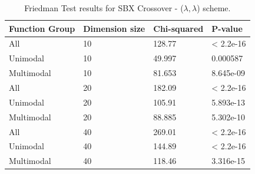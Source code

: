 \begin{table}[h]
	\centering
	\begin{tabular}{|l|l|l|l|}
		\hline
		\textbf{Function Group} & \textbf{Dimension size}      & \textbf{Chi-squared}        & \textbf{P-value}                     \\ \hline
		\multicolumn{1}{|l|}{All} & \multicolumn{1}{|l|}{10} & \multicolumn{1}{l|}{128.77} & \multicolumn{1}{l|}{< 2.2e-16} \\ \hline
		\multicolumn{1}{|l|}{Unimodal} & \multicolumn{1}{|l|}{10} & \multicolumn{1}{l|}{49.997} & \multicolumn{1}{l|}{0.000587} \\ \hline
		\multicolumn{1}{|l|}{Multimodal} & \multicolumn{1}{|l|}{10} & \multicolumn{1}{l|}{81.653} & \multicolumn{1}{l|}{8.645e-09}  \\ \hline
		\hline
		\multicolumn{1}{|l|}{All} & \multicolumn{1}{|l|}{20} & \multicolumn{1}{l|}{182.09} & \multicolumn{1}{l|}{< 2.2e-16} \\ \hline
		\multicolumn{1}{|l|}{Unimodal} & \multicolumn{1}{|l|}{20} & \multicolumn{1}{l|}{105.91} & \multicolumn{1}{l|}{5.893e-13} \\ \hline
		\multicolumn{1}{|l|}{Multimodal} & \multicolumn{1}{|l|}{20} & \multicolumn{1}{l|}{88.885} & \multicolumn{1}{l|}{5.302e-10}  \\ \hline
		\hline
		\multicolumn{1}{|l|}{All} & \multicolumn{1}{|l|}{40} & \multicolumn{1}{l|}{269.01} & \multicolumn{1}{l|}{< 2.2e-16} 						\\ \hline
		\multicolumn{1}{|l|}{Unimodal} & \multicolumn{1}{|l|}{40} & \multicolumn{1}{l|}{144.89} & \multicolumn{1}{l|}{< 2.2e-16} \\ \hline
		\multicolumn{1}{|l|}{Multimodal} & \multicolumn{1}{|l|}{40} & \multicolumn{1}{l|}{118.46} & \multicolumn{1}{l|}{3.316e-15}  \\ \hline
	\end{tabular}
	\caption{Friedman Test results for SBX Crossover - ($\lambda, \lambda$) scheme.}
	\label{Friedman_test_sbx}	
\end{table}

